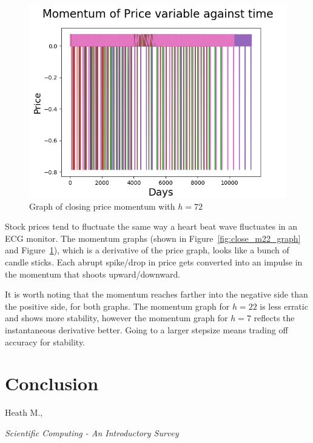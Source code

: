 \documentclass[8pt]{article}
\begin{document}
	\begin{figure}[h]
		\centering
		\includegraphics{all_momentum_step_7.png}
		\caption{Graph of closing price momentum with $h=72$}
		\label{fig:close_m7_graph}
	\end{figure}

	Stock prices tend to fluctuate the same way a heart beat wave fluctuates in an ECG monitor.
	The momentum graphs (shown in Figure~\ref{fig:close_m22_graph} and Figure~\ref{fig:close_m7_graph}), which is a derivative of the price graph, looks like a bunch of candle sticks.
	Each abrupt spike/drop in price gets converted into an impulse in the momentum that shoots upward/downward. 

	It is worth noting that the momentum reaches farther into the negative side than the positive side, for both graphs.
	The momentum graph for $h=22$ is less erratic and shows more stability, however the momentum graph for $h=7$ reflects the instantaneous derivative better.
	Going to a larger stepsize means trading off accuracy for stability.

	\section{Conclusion}
	\begin{thebibliography}{9}
			Heath M.,

			\textit{Scientific Computing - An Introductory Survey}
	\end{thebibliography}
\end{document}
